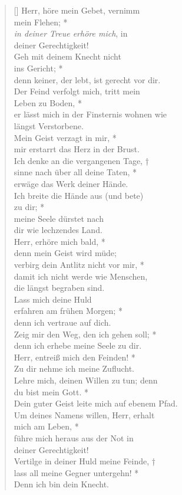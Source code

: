 \begin{verse}[\versewidth]
 Herr, höre mein Gebet, vernimm\\ mein Flehen; *\\
\textit{in deiner Treue erhöre mich}, in \\deiner Gerechtigkeit!\\
\vin Geh mit deinem Knecht nicht\\ \vin ins Gericht; *\\
\vin denn keiner, der lebt, ist gerecht vor dir. \\
Der Feind verfolgt mich, tritt mein \\ Leben zu Boden, *\\
er lässt mich in der Finsternis wohnen wie \\ längst Verstorbene. \\
\vin Mein Geist verzagt in mir, *\\
\vin mir erstarrt das Herz in der Brust. \\
Ich denke an die vergangenen Tage, †\\
sinne nach über all deine Taten, *\\ erwäge das Werk deiner Hände. \\
\vin Ich breite die Hände aus (und bete)\\ \vin  zu dir; *\\
\vin meine Seele dürstet nach\\ \vin  dir wie lechzendes Land. \\
Herr, erhöre mich bald, *\\
denn mein Geist wird müde; \\
\vin verbirg dein Antlitz nicht vor mir, * \\
\vin  damit ich nicht werde wie Menschen, \\ \vin die längst begraben sind.\\
Lass mich deine Huld \\erfahren am frühen Morgen; *\\
denn ich vertraue auf dich. \\
\vin Zeig mir den Weg, den ich gehen soll; *\\ \vin denn ich erhebe meine Seele zu dir. \\
Herr, entreiß mich den Feinden! *\\
Zu dir nehme ich meine Zuflucht.\\
\vin Lehre mich, deinen Willen zu tun; denn \\ \vin du bist mein Gott. *\\
\vin Dein guter Geist leite mich auf ebenem Pfad.\\ 
Um deines Namens willen, Herr, erhalt\\mich am Leben, *\\
führe mich heraus aus der Not in \\deiner Gerechtigkeit!\\
\vin Vertilge in deiner Huld meine Feinde, †\\
\vin lass all meine Gegner untergehn! * \\ \vin Denn ich bin dein Knecht. \\


\end{verse}
